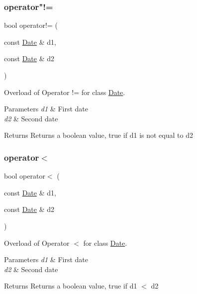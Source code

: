 \subsubsection{\texorpdfstring{operator"!=}{operator!=}}
{\footnotesize\ttfamily bool operator!= (\begin{DoxyParamCaption}\item[{const \hyperlink{class_date}{Date} \&}]{d1,  }\item[{const \hyperlink{class_date}{Date} \&}]{d2 }\end{DoxyParamCaption})\hspace{0.3cm}{\ttfamily [friend]}}

Overload of Operator != for class \hyperlink{class_date}{Date}. 
\begin{DoxyParams}{Parameters}
{\em d1} & First date \\
\hline
{\em d2} & Second date \\
\hline
\end{DoxyParams}
\begin{DoxyReturn}{Returns}
Returns a boolean value, true if d1 is not equal to d2 
\end{DoxyReturn}
\hypertarget{class_date_a5a3f411cbd59e9ecb90b2f8e6aaea551}{}\label{class_date_a5a3f411cbd59e9ecb90b2f8e6aaea551} 
\subsubsection{\texorpdfstring{operator$<$}{operator<}}
{\footnotesize\ttfamily bool operator$<$ (\begin{DoxyParamCaption}\item[{const \hyperlink{class_date}{Date} \&}]{d1,  }\item[{const \hyperlink{class_date}{Date} \&}]{d2 }\end{DoxyParamCaption})\hspace{0.3cm}{\ttfamily [friend]}}

Overload of Operator $<$ for class \hyperlink{class_date}{Date}. 
\begin{DoxyParams}{Parameters}
{\em d1} & First date \\
\hline
{\em d2} & Second date \\
\hline
\end{DoxyParams}
\begin{DoxyReturn}{Returns}
Returns a boolean value, true if d1 $<$ d2 
\end{DoxyReturn}
\hypertarget{class_date_a5c29d00ecf33e6d232a410f1f3d6eb70}{}\label{class_date_a5c29d00ecf33e6d232a410f1f3d6eb70} 
